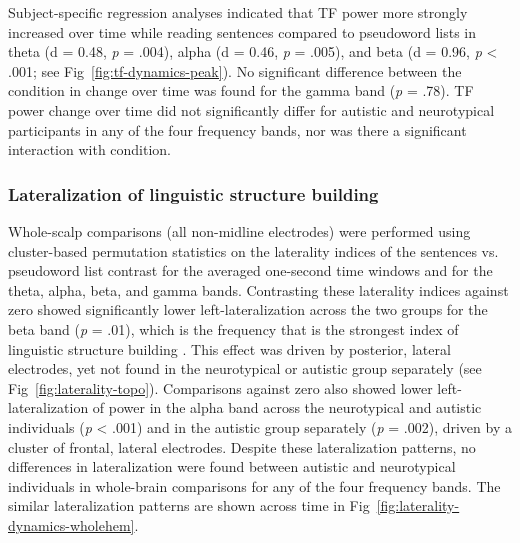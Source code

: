 Subject-specific regression analyses indicated that TF power more strongly increased over time while reading sentences compared to pseudoword lists in theta (d = 0.48, \textit{p} = .004), alpha (d = 0.46, \textit{p} = .005), and beta (d = 0.96, \textit{p} <  .001; see Fig~\ref{fig:tf-dynamics-peak}). No significant difference between the condition in change over time was found for the gamma band (\textit{p} = .78). TF power change over time did not significantly differ for autistic and neurotypical participants in any of the four frequency bands, nor was there a significant interaction with condition. 







\subsubsection{Lateralization of linguistic structure building}
Whole-scalp comparisons (all non-midline electrodes) were performed using cluster-based permutation statistics on the laterality indices of the sentences vs. pseudoword list contrast for the averaged one-second time windows and for the theta, alpha, beta, and gamma bands. Contrasting these laterality indices against zero showed significantly lower left-lateralization across the two groups for the beta band (\textit{p} = .01), which is the frequency that is the strongest index of linguistic structure building \citep{bastiaansen2010,bastiaansen2015}. This effect was driven by posterior, lateral electrodes, yet not found in the neurotypical or autistic group separately (see Fig~\ref{fig:laterality-topo}). Comparisons against zero also showed lower left-lateralization of power in the alpha band across the neurotypical and autistic individuals (\textit{p} <  .001) and in the autistic group separately (\textit{p} = .002), driven by a cluster of frontal, lateral electrodes. Despite these lateralization patterns, no differences in lateralization were found between autistic and neurotypical individuals in whole-brain comparisons for any of the four frequency bands. The similar lateralization patterns are shown across time in Fig~\ref{fig:laterality-dynamics-wholehem}.



 

